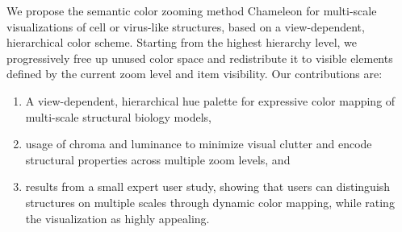 \documentclass{egpubl}
\begin{document}
	We propose the semantic color zooming method Chameleon for multi-scale visualizations of cell or virus-like structures, based on a view-dependent, hierarchical color scheme.
	Starting from the highest hierarchy level, we progressively free up unused color space and redistribute it to visible elements defined by the current zoom level and item visibility.
	Our contributions are: 
	\begin{enumerate}
		\item A view-dependent, hierarchical hue palette for expressive color mapping of multi-scale structural biology models, 
		\item usage of chroma and luminance to minimize visual clutter and encode structural properties across multiple zoom levels, and 
		\item results from a small expert user study, showing that users can distinguish structures on multiple scales through dynamic color mapping, while rating the visualization as highly appealing. 
	\end{enumerate}
	
	
\end{document}
